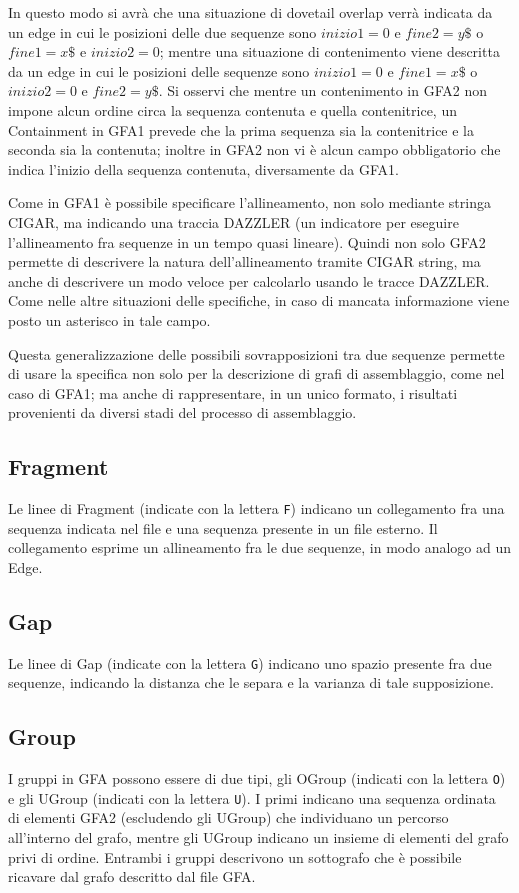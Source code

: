 In questo modo si avrà che una situazione di dovetail overlap
verrà indicata da un edge in cui le posizioni delle due sequenze
sono  $inizio1=0$ e $fine2=y\$$ o $fine1=x\$$ e $inizio2=0$;
mentre una situazione di contenimento viene descritta
da un edge in cui le posizioni delle sequenze sono $inizio1=0$ e 
$fine1=x\$$ o $inizio2=0$ e $fine2=y\$$. Si osservi che mentre
un contenimento in GFA2 non impone alcun ordine circa la sequenza
contenuta e quella contenitrice, un Containment in GFA1 prevede
che la prima sequenza sia la contenitrice e la seconda sia la contenuta;
inoltre in GFA2 non vi è alcun campo obbligatorio che indica l'inizio della
sequenza contenuta, diversamente da GFA1.

Come in GFA1 è possibile specificare l'allineamento, non solo mediante
stringa CIGAR, ma indicando una traccia DAZZLER (un indicatore
per eseguire l'allineamento fra sequenze in un tempo quasi lineare).
Quindi non solo GFA2 permette di descrivere la natura dell'allineamento tramite
CIGAR string, ma anche di descrivere un modo veloce per calcolarlo usando
le tracce DAZZLER. Come nelle altre situazioni delle specifiche, in caso
di mancata informazione viene posto un asterisco in tale campo.

Questa generalizzazione delle possibili sovrapposizioni tra due sequenze
permette di usare la specifica non solo per la descrizione di grafi di assemblaggio,
come nel caso di GFA1; ma anche di rappresentare, in un unico formato,
i risultati provenienti da diversi stadi del processo di assemblaggio.

\subsection{Fragment}
Le linee di Fragment (indicate con la lettera \texttt{F}) indicano un
collegamento fra una sequenza indicata nel file e una sequenza presente in un file esterno.
Il collegamento esprime un allineamento fra le due sequenze, in modo analogo ad
un Edge.

\subsection{Gap}
Le linee di Gap (indicate con la lettera \texttt{G}) indicano uno spazio
presente fra due sequenze, indicando la distanza che le separa e la
varianza di tale supposizione.

\subsection{Group}
I gruppi in GFA possono essere di due tipi, gli OGroup (indicati con la lettera \texttt{O})
e gli UGroup (indicati con la lettera \texttt{U}). I primi indicano una sequenza ordinata di elementi
GFA2 (escludendo gli UGroup) che individuano un percorso all'interno del grafo, mentre
gli UGroup indicano un insieme di elementi del grafo privi di ordine. Entrambi
i gruppi descrivono un sottografo che è possibile ricavare
dal grafo descritto dal file GFA.

